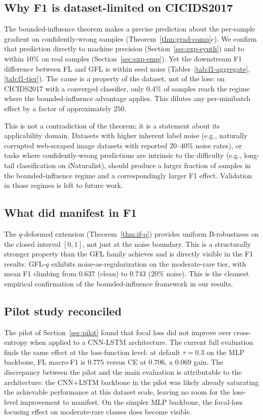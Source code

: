 \documentclass[conference]{IEEEtran}
\theoremstyle{definition}
\begin{document}
\subsection{Why F1 is dataset-limited on CICIDS2017}
The bounded-influence theorem makes a precise prediction about the per-sample gradient on confidently-wrong samples (Theorem~\ref{thm:grad-comp}c). We confirm that prediction directly to machine precision (Section~\ref{sec:exp-synth}) and to within $10\%$ on real samples (Section~\ref{sec:exp-emp}). Yet the downstream F1 difference between FL and GFL is within seed noise (Tables~\ref{tab:f1-aggregate}, \ref{tab:f1-tier}). The cause is a property of the dataset, not of the loss: on CICIDS2017 with a converged classifier, only $0.4\%$ of samples reach the regime where the bounded-influence advantage applies. This dilutes any per-minibatch effect by a factor of approximately $250$.

This is not a contradiction of the theorem; it is a statement about its applicability domain. Datasets with higher inherent label noise (e.g., naturally corrupted web-scraped image datasets with reported $20$--$40\%$ noise rates), or tasks where confidently-wrong predictions are intrinsic to the difficulty (e.g., long-tail classification on iNaturalist), should produce a larger fraction of samples in the bounded-influence regime and a correspondingly larger F1 effect. Validation in those regimes is left to future work.

\subsection{What did manifest in F1}
The $q$-deformed extension (Theorem~\ref{thm:if-q}) provides uniform B-robustness on the closed interval $[0,1]$, not just at the noise boundary. This is a structurally stronger property than the GFL family achieves and is directly visible in the F1 results: GFL-$q$ exhibits noise-as-regularization on the moderate-rare tier, with mean F1 climbing from $0.637$ (clean) to $0.743$ ($20\%$ noise). This is the cleanest empirical confirmation of the bounded-influence framework in our results.

\subsection{Pilot study reconciled}
The pilot of Section~\ref{sec:pilot} found that focal loss did not improve over cross-entropy when applied to a CNN-LSTM architecture. The current full evaluation finds the same effect at the loss-function level: at default $\tau = 0.3$ on the MLP backbone, FL macro-F1 is $0.775$ versus CE at $0.706$, a $0.069$ gain. The discrepancy between the pilot and the main evaluation is attributable to the architecture: the CNN+LSTM backbone in the pilot was likely already saturating the achievable performance at this dataset scale, leaving no room for the loss-level improvement to manifest. On the simpler MLP backbone, the focal-loss focusing effect on moderate-rare classes does become visible.
\end{document}
